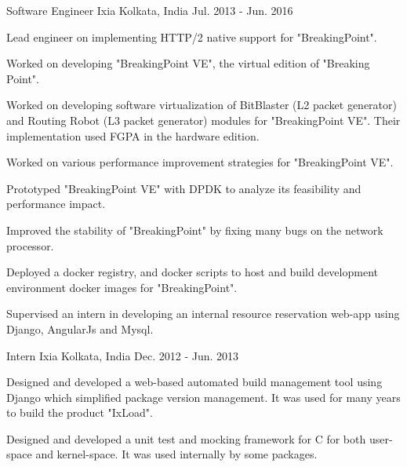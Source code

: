 \begin{cventries}
  \cventry
    {Software Engineer} %
    {Ixia} %
    {Kolkata, India} %
    {Jul. 2013 - Jun. 2016} %
    {\begin{cvitems} %
        \item {Lead engineer on implementing HTTP/2 native support for "BreakingPoint".}
        \item {Worked on developing "BreakingPoint VE", the virtual edition of "Breaking Point".}
        \item {Worked on developing software virtualization of BitBlaster (L2 packet generator) and Routing Robot (L3 packet generator) modules for "BreakingPoint VE". Their implementation used FGPA in the hardware edition.}
        \item {Worked on various performance improvement strategies for "BreakingPoint VE".}
        \item {Prototyped "BreakingPoint VE" with DPDK to analyze its feasibility and performance impact.}
        \item {Improved the stability of "BreakingPoint" by fixing many bugs on the network processor.}
        \item {Deployed a docker registry, and docker scripts to host and build development environment docker images for "BreakingPoint".}
        \item {Supervised an intern in developing an internal resource reservation web-app using Django, AngularJs and Mysql.}
      \end{cvitems}}

  \cventry
    {Intern} %
    {Ixia} %
    {Kolkata, India} %
    {Dec. 2012 - Jun. 2013} %
    {\begin{cvitems} %
        \item {Designed and developed a web-based automated build management tool using Django which simplified package version management. It was used for many years to build the product "IxLoad".}
        \item {Designed and developed a unit test and mocking framework for C for both user-space and kernel-space. It was used internally by some packages.}
      \end{cvitems}}

\end{cventries}
